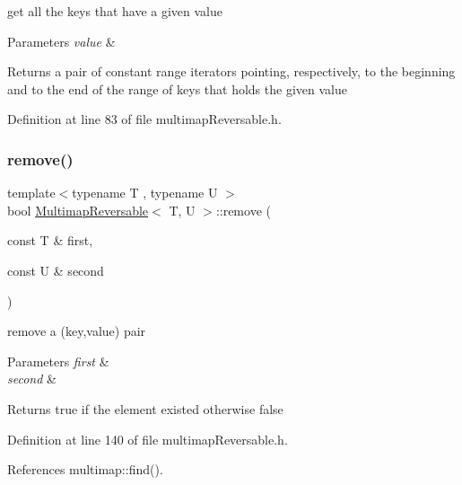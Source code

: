 get all the keys that have a given value 
\begin{DoxyParams}{Parameters}
{\em value} & \\
\hline
\end{DoxyParams}
\begin{DoxyReturn}{Returns}
a pair of constant range iterators pointing, respectively, to the beginning and to the end of the range of keys that holds the given value 
\end{DoxyReturn}


Definition at line 83 of file multimap\+Reversable.\+h.

\mbox{\label{classMultimapReversable_a11a0f10468c240813178e0a3f682eef5}} 
\subsubsection{\texorpdfstring{remove()}{remove()}}
{\footnotesize\ttfamily template$<$typename T , typename U $>$ \\
bool \hyperlink{classMultimapReversable}{Multimap\+Reversable}$<$ T, U $>$\+::remove (\begin{DoxyParamCaption}\item[{const T \&}]{first,  }\item[{const U \&}]{second }\end{DoxyParamCaption})\hspace{0.3cm}{\ttfamily [inline]}}

remove a (key,value) pair 
\begin{DoxyParams}{Parameters}
{\em first} & \\
\hline
{\em second} & \\
\hline
\end{DoxyParams}
\begin{DoxyReturn}{Returns}
true if the element existed otherwise false 
\end{DoxyReturn}


Definition at line 140 of file multimap\+Reversable.\+h.



References multimap\+::find().

